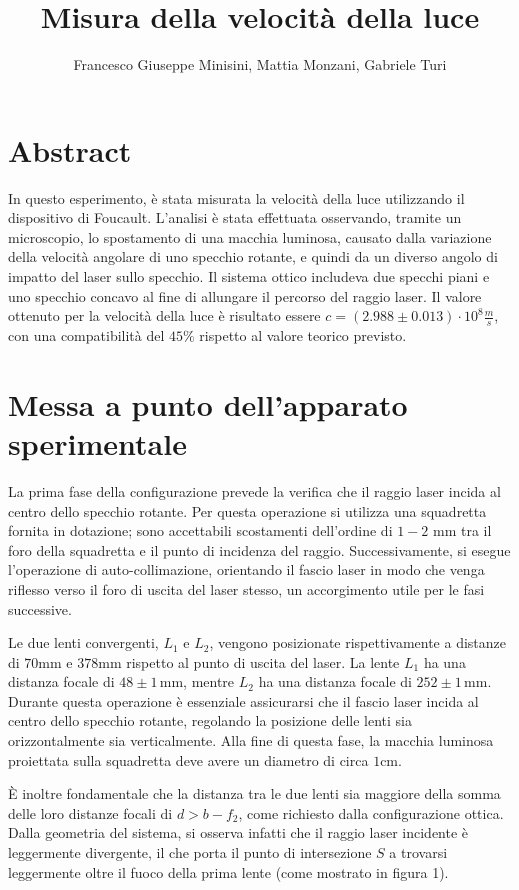 \documentclass{article}
\title{ Misura della velocità della luce}
\author{Francesco Giuseppe Minisini, Mattia Monzani, Gabriele Turi}
\begin{document}
\maketitle

\section{Abstract}
%
In questo esperimento, è stata misurata la velocità della luce utilizzando il dispositivo di Foucault. L'analisi è stata effettuata osservando, tramite un microscopio, lo spostamento di una macchia luminosa, causato dalla variazione della velocità angolare di uno specchio rotante, e quindi da un diverso angolo di impatto del laser sullo specchio. Il sistema ottico includeva due specchi piani e uno specchio concavo al fine di allungare il percorso del raggio laser. Il valore ottenuto per la velocità della luce è risultato essere \(c=(2.988\pm0.013)\cdot10^8\frac{m}{s}\), con una compatibilità del \(45\%\) rispetto al valore teorico previsto.

\section{Messa a punto dell'apparato sperimentale}
%
La prima fase della configurazione prevede la verifica che il raggio laser incida al centro dello specchio rotante. Per questa operazione si utilizza una squadretta fornita in dotazione; sono accettabili scostamenti dell’ordine di \(1-2 \text{ mm}\) tra il foro della squadretta e il punto di incidenza del raggio. Successivamente, si esegue l’operazione di auto-collimazione, orientando il fascio laser in modo che venga riflesso verso il foro di uscita del laser stesso, un accorgimento utile per le fasi successive.

Le due lenti convergenti, \( L_1 \) e \( L_2 \), vengono posizionate rispettivamente a distanze di \(70 \text{mm}\) e \(378 \text{mm}\) rispetto al punto di uscita del laser. La lente \( L_1 \) ha una distanza focale di \( 48 \pm 1 \, \text{mm} \), mentre \( L_2 \) ha una distanza focale di \( 252 \pm 1 \, \text{mm} \). Durante questa operazione è essenziale assicurarsi che il fascio laser incida al centro dello specchio rotante, regolando la posizione delle lenti sia orizzontalmente sia verticalmente. Alla fine di questa fase, la macchia luminosa proiettata sulla squadretta deve avere un diametro di circa \(1\text{cm}\).



È inoltre fondamentale che la distanza tra le due lenti sia maggiore della somma delle loro distanze focali di \( d > b - f_2 \), come richiesto dalla configurazione ottica. Dalla geometria del sistema, si osserva infatti che il raggio laser incidente è leggermente divergente, il che porta il punto di intersezione \( S \) a trovarsi leggermente oltre il fuoco della prima lente (come mostrato in figura 1).
\end{document}
